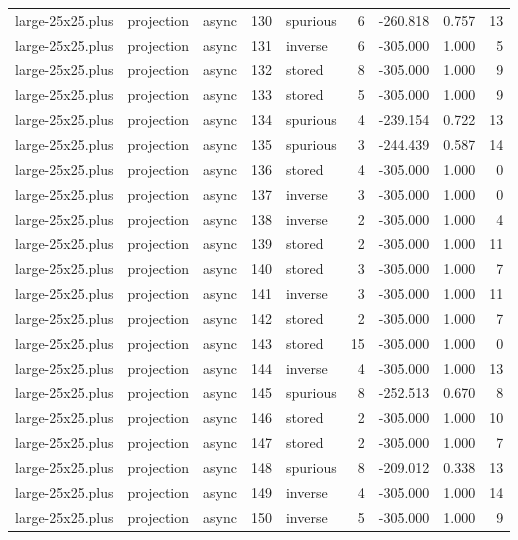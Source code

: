 \begin{tabular}{lllrlrrrr}
large-25x25.plus & projection & async & 130 & spurious & 6 & -260.818 & 0.757 & 13 \\
large-25x25.plus & projection & async & 131 & inverse & 6 & -305.000 & 1.000 & 5 \\
large-25x25.plus & projection & async & 132 & stored & 8 & -305.000 & 1.000 & 9 \\
large-25x25.plus & projection & async & 133 & stored & 5 & -305.000 & 1.000 & 9 \\
large-25x25.plus & projection & async & 134 & spurious & 4 & -239.154 & 0.722 & 13 \\
large-25x25.plus & projection & async & 135 & spurious & 3 & -244.439 & 0.587 & 14 \\
large-25x25.plus & projection & async & 136 & stored & 4 & -305.000 & 1.000 & 0 \\
large-25x25.plus & projection & async & 137 & inverse & 3 & -305.000 & 1.000 & 0 \\
large-25x25.plus & projection & async & 138 & inverse & 2 & -305.000 & 1.000 & 4 \\
large-25x25.plus & projection & async & 139 & stored & 2 & -305.000 & 1.000 & 11 \\
large-25x25.plus & projection & async & 140 & stored & 3 & -305.000 & 1.000 & 7 \\
large-25x25.plus & projection & async & 141 & inverse & 3 & -305.000 & 1.000 & 11 \\
large-25x25.plus & projection & async & 142 & stored & 2 & -305.000 & 1.000 & 7 \\
large-25x25.plus & projection & async & 143 & stored & 15 & -305.000 & 1.000 & 0 \\
large-25x25.plus & projection & async & 144 & inverse & 4 & -305.000 & 1.000 & 13 \\
large-25x25.plus & projection & async & 145 & spurious & 8 & -252.513 & 0.670 & 8 \\
large-25x25.plus & projection & async & 146 & stored & 2 & -305.000 & 1.000 & 10 \\
large-25x25.plus & projection & async & 147 & stored & 2 & -305.000 & 1.000 & 7 \\
large-25x25.plus & projection & async & 148 & spurious & 8 & -209.012 & 0.338 & 13 \\
large-25x25.plus & projection & async & 149 & inverse & 4 & -305.000 & 1.000 & 14 \\
large-25x25.plus & projection & async & 150 & inverse & 5 & -305.000 & 1.000 & 9 \\

\end{tabular}
